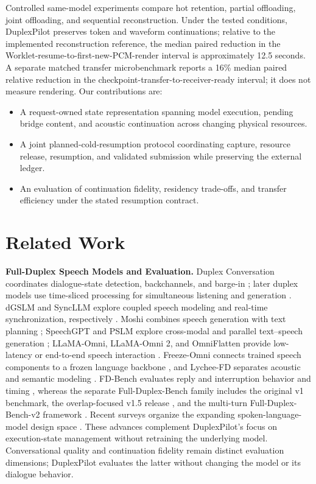 \documentclass{article}
\begin{document}
Controlled same-model experiments compare hot retention, partial offloading,
joint offloading, and sequential reconstruction. Under the tested
conditions, DuplexPilot preserves token and waveform continuations; relative
to the implemented reconstruction reference, the median paired reduction in
the Worklet-resume-to-first-new-PCM-render interval is approximately
12.5 seconds. A separate matched transfer microbenchmark reports a 16\%
median paired relative reduction in the checkpoint-transfer-to-receiver-ready
interval; it does not measure rendering. Our contributions are:
\begin{itemize}
    \item A request-owned state representation spanning model execution,
    pending bridge content, and acoustic continuation across changing
    physical resources.
    \item A joint planned-cold-resumption protocol coordinating capture, resource
    release, resumption, and validated submission while preserving the external ledger.
    \item An evaluation of continuation fidelity, residency trade-offs,
    and transfer efficiency under the stated resumption contract.
\end{itemize}

\section{Related Work}
\label{sec:related_work}

\noindent\textbf{Full-Duplex Speech Models and Evaluation.}
Duplex Conversation coordinates dialogue-state detection, backchannels,
and barge-in \citep{duplexconversation2022}; later duplex models use
time-sliced processing for simultaneous listening and generation
\citep{duplexmodel2024}. dGSLM and SyncLLM
explore coupled speech modeling and real-time synchronization,
respectively \citep{dgslm2023,syncllm2024}.
Moshi combines speech generation with text planning \citep{moshi2024};
SpeechGPT and PSLM explore cross-modal and parallel text--speech generation
\citep{speechgpt2023,pslm2024}; LLaMA-Omni, LLaMA-Omni 2, and OmniFlatten
provide low-latency or end-to-end speech interaction
\citep{llamaomni2025,llamaomni2_2025,omniflatten2025}. Freeze-Omni connects
trained speech components to a frozen language backbone \citep{freezeomni2025},
and Lychee-FD separates acoustic and semantic modeling \citep{lychee2026}.
FD-Bench evaluates reply and interruption behavior and timing
\citep{fdbench2025}, whereas the separate Full-Duplex-Bench family includes
the original v1 benchmark, the overlap-focused v1.5 release
\citep{fdbv1_2025,fdbv15_2025}, and the multi-turn Full-Duplex-Bench-v2
framework \citep{fdbv2_2026}. Recent surveys
organize the expanding spoken-language-model design space
\citep{arora2025slm}.
These advances complement DuplexPilot's focus on execution-state
management without retraining the underlying model.
Conversational quality and continuation fidelity remain distinct
evaluation dimensions; DuplexPilot evaluates the latter without
changing the model or its dialogue behavior.
\end{document}
